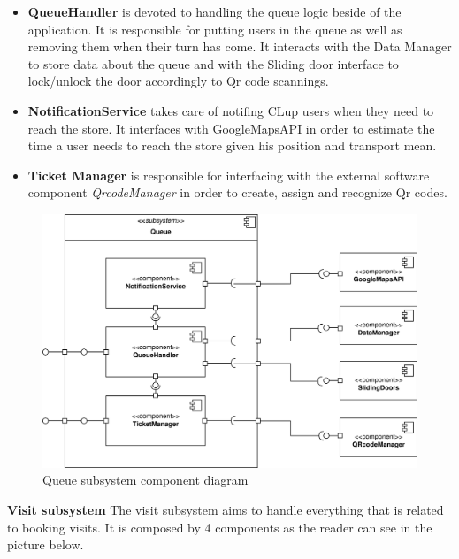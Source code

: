 \documentclass[]{article}
\begin{document}
	\begin{itemize}
		\item 	\textbf{QueueHandler} is devoted to handling the queue logic beside of the application. It is responsible for putting users in the queue as well as removing them when their turn has come. It interacts with the Data Manager to store data about the queue and with the Sliding door interface to lock/unlock the door accordingly to Qr code scannings.
		
		\item 	\textbf{NotificationService} takes care of notifing CLup users when they need to reach the store. It interfaces with GoogleMapsAPI in order to estimate the time a user needs to reach the store given his position and transport mean.
		
		\item 	\textbf{Ticket Manager} is responsible for interfacing with the external software component \textit{QrcodeManager} in order to create, assign and recognize Qr codes.
		
	
	\end{itemize}

	
	\begin{figure}[H]
			\centering
			\includegraphics[scale=0.9]{ComponentView/queueComponent.png}
			\caption{Queue subsystem component diagram}
			\label{fig:Queuediagram}
		\end{figure}
		\bigskip\bigskip
		
	\newpage
	\noindent
	\textbf{Visit subsystem}
	\medskip \newline
	The visit subsystem aims to handle everything that is related to booking visits. It is composed by 4 components as the reader can see in the picture below. 
	\bigskip
	
\end{document}
